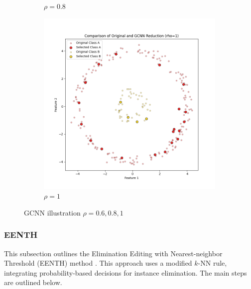 \begin{figure}[htbp]
\begin{subfigure}[b]{0.3\textwidth}
		\caption{$\rho = 0.8$}
		\label{fig:rho0.8}
	\end{subfigure}
	\hfill
	\begin{subfigure}[b]{0.3\textwidth}
		\centering
		\includegraphics[width=\textwidth]{figures/gcnn/comparison_plot_rho_1.png} %
		\caption{$\rho = 1$}
		\label{fig:rho1}
	\end{subfigure}
	\caption{GCNN illustration $\rho=0.6,0.8,1$}
	\label{fig:rho_variation_2}
\end{figure}


\subsubsection{EENTH}
This subsection outlines the Elimination Editing with Nearest-neighbor Threshold (EENTH) method \cite{vazquez2005}. This approach uses a modified $k$-NN rule, integrating probability-based decisions for instance elimination. The main steps are outlined below.

